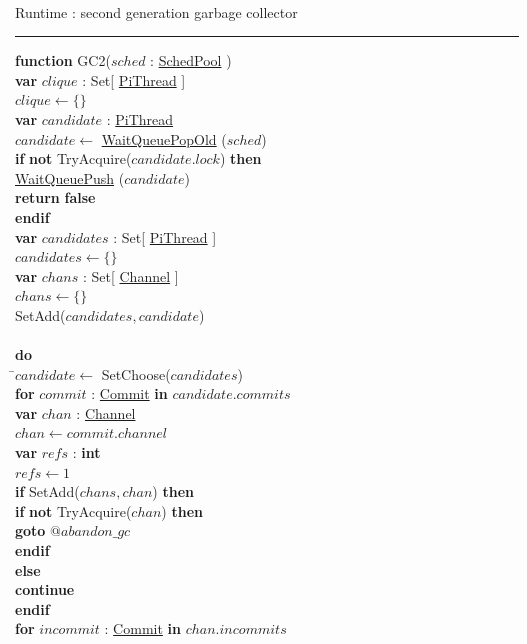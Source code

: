\documentclass[a4paper,11pt]{article}
\newenvironment{program}{
  \begin{sffamily}
  \begin{scriptsize}
  \begin{tabbing}}
 {\end{tabbing}
  \end{scriptsize}
  \end{sffamily}}
\newcommand{\kw}[1]{\textsf{\textbf{#1}}}
\newcommand{\pindent}{\hspace{2em}\=}
\newcommand{\synchro}[1]{\textcolor{synchrocolor}{#1}}
\newcommand{\algotitle}[1]{\noindent\\ \noindent#1\par\nobreak\vspace{3pt}\hrule\vspace{6pt}}
\newcommand{\algosection}[1]{
  \phantomsection
  \algotitle{#1}
}
\newcommand{\myref}[1]{
  \hyperref[#1]{#1}
}
\begin{document}
\label{GC2}
\algosection{Runtime : second generation garbage collector}
\begin{program}
  \kw{function} GC2($sched$ : \myref{SchedPool}) \\
  \pindent\kw{var} $clique$ : Set[\myref{PiThread}] \\
  \>$clique \leftarrow \{\}$ \\
  \>\kw{var} $candidate$ : \myref{PiThread} \\
  \>$candidate \leftarrow$ \synchro{\myref{WaitQueuePopOld}($sched$)} \\
  \>\kw{if} \synchro{\kw{not} TryAcquire($candidate.lock$)} \kw{then} \\
  \>\pindent\synchro{\myref{WaitQueuePush}($candidate$)} \\
  \>\>\kw{return} \kw{false} \\
  \>\kw{endif} \\
  \>\kw{var} $candidates$ : Set[\myref{PiThread}] \\
  \>$candidates \leftarrow \{\}$ \\
  \>\kw{var} $chans$ : Set[\myref{Channel}] \\
  \>$chans \leftarrow \{\}$ \\
  \>SetAdd($candidates, candidate$) \\
  \> \\
  \>\kw{do} \\
  \>\pindent$candidate \leftarrow$ SetChoose($candidates$) \\
  \>\>\kw{for} $commit$ : \myref{Commit} \kw{in} $candidate.commits$ \\
  \>\>\pindent\kw{var} $chan$ : \myref{Channel} \\
  \>\>\>$chan \leftarrow commit.channel$ \\
  \>\>\>\kw{var} $refs$ : \kw{int} \\
  \>\>\>$refs \leftarrow 1$ \\
  \>\>\>\kw{if} SetAdd($chans, chan$) \kw{then} \\
  \>\>\>\pindent\kw{if} \synchro{\kw{not} TryAcquire($chan$)} \kw{then} \\
  \>\>\>\>\pindent\kw{goto} $@abandon\_gc$ \\
  \>\>\>\>\kw{endif} \\
  \>\>\>\kw{else} \\
  \>\>\>\pindent\kw{continue} \\
  \>\>\>\kw{endif} \\
  \>\>\>\kw{for} $incommit$ : \myref{Commit} \kw{in} $chan.incommits$ \\

\end{program}
\end{document}
